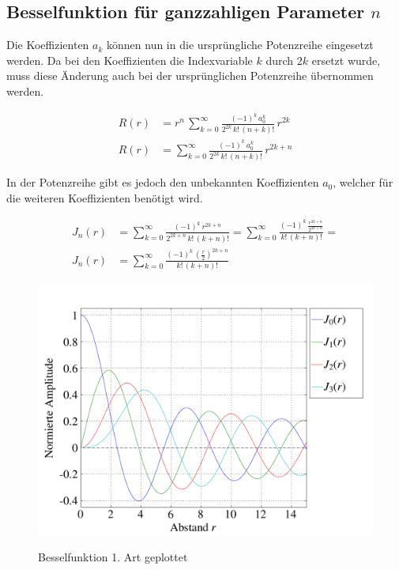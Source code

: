 \subsection[Besselfunktion 1. Art]{Besselfunktion f\"ur ganzzahligen Parameter $n$}
\begin{normalsize}
Die Koeffizienten $a_k$ k\"onnen nun in die urspr\"ungliche Potenzreihe  eingesetzt werden.
Da bei den Koeffizienten die Indexvariable $k$ durch $2k$ ersetzt wurde,
muss diese \"Anderung auch bei der urspr\"unglichen Potenzreihe \"ubernommen werden.
\end{normalsize}
\begin{align}
	\nonumber
	R \left( r \right)
	&=
	r^{n} \,
	\sum_{k=0}^{\infty}
	\frac
	{
		\left( -1 \right) ^k \, a_0 ^k
	}{
		2^{2k} \, {k}! \, {\left( n + k \right)}!
	}
	\, r^{2k}
	\\
	R \left( r \right)
	&=
	\sum_{k=0}^{\infty}
	\frac
	{
		\left( -1 \right) ^k \, a_0 ^k
	}{
		2^{2k} \, {k}! \, {\left( n + k \right)}!
	}
	\, r^{2k + n}
	\label{eq:bessel:potenzreihe:koeffizienten:eingesetzt}
\end{align}
\begin{normalsize}
In der Potenzreihe  gibt es jedoch den unbekannten Koeffizienten $a_0$,
welcher f\"ur die weiteren Koeffizienten ben\"otigt wird.
\end{normalsize}
\begin{align}
	J_n \left( r \right)
	&= \nonumber
	\sum_{k=0} ^{\infty}
	\frac
	{
		\left( - 1 \right) ^k \, r ^{2k+n}
	}{
		2^{2k+n} \, {k}! \, { \left( k + n \right) }!
	}
	=
	\sum_{k=0} ^{\infty}
	\frac
	{
		\left( - 1 \right) ^k \, 
		\frac
		{
			r ^{2k+n}
		}{
			2^{2k+n}
		}
	}{
		{k}! \, { \left( k + n \right) }!
	} 
	=
	\\
	J_n \left( r \right)
	&=
	\sum_{k=0} ^{\infty}
	\frac
	{
		\left( - 1 \right) ^k \, 
		\left(		
		\frac
		{
			r
		}{
			2
		} \right) ^{2k+n}
	}{
		{k}! \, { \left( k + n \right) }!
	}
	\label{eq:bessel_summenformel}
\end{align}
\begin{figure}[h]
	\begin{center}
		\includegraphics[scale=0.5]{kreis/besselfunction.pdf}
		\label{img:besselfunction}
		\caption[Besselfunktion]{Besselfunktion 1. Art geplottet}
	\end{center}
\end{figure}